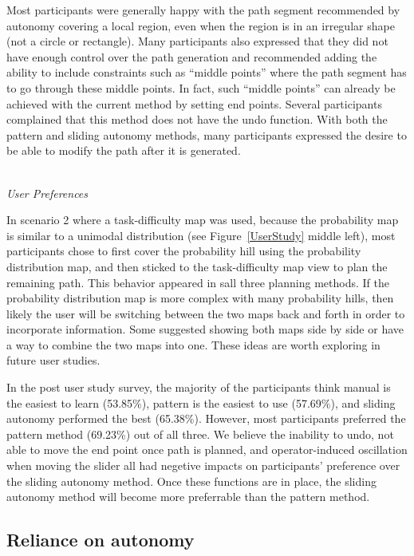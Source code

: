 Most participants were generally happy with the path segment recommended by autonomy covering a local region, even when the region is in an irregular shape (not a circle or rectangle). Many participants also expressed that they did not have enough control over the path generation and recommended adding the ability to include constraints such as ``middle points'' where the path segment has to go through these middle points. In fact, such ``middle points'' can already be achieved with the current method by setting end points. Several participants complained that this method does not have the undo function. With both the pattern and sliding autonomy methods, many participants expressed the desire to be able to modify the path after it is generated.

~\\ \noindent \textit{User Preferences}

In scenario 2 where a task-difficulty map was used, because the probability map is similar to a unimodal distribution (see Figure~\ref{UserStudy} middle left), most participants chose to first cover the probability hill using the probability distribution map, and then sticked to the task-difficulty map view to plan the remaining path. This behavior appeared in sall three planning methods. If the probability distribution map is more complex with many probability hills, then likely the user will be switching between the two maps back and forth in order to incorporate information. Some suggested showing both maps side by side or have a way to combine the two maps into one. These ideas are worth exploring in future user studies.

In the post user study survey, the majority of the participants think manual is the easiest to learn (53.85\%), pattern is the easiest to use (57.69\%), and sliding autonomy performed the best (65.38\%). However, most participants preferred the pattern method (69.23\%) out of all three. We believe the inability to undo, not able to move the end point once path is planned, and operator-induced oscillation when moving the slider all had negetive impacts on participants' preference over the sliding autonomy method. Once these functions are in place, the sliding autonomy method will become more preferrable than the pattern method.

\subsection{Reliance on autonomy}


